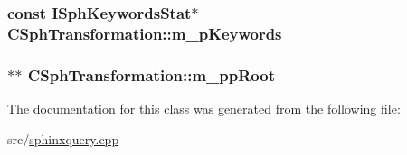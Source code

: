 \hypertarget{classCSphTransformation_a30ec948b31d378614b00f6846eb86810}{
\subsubsection[{m\-\_\-p\-Keywords}]{\setlength{\rightskip}{0pt plus 5cm}const {\bf I\-Sph\-Keywords\-Stat}$\ast$ C\-Sph\-Transformation\-::m\-\_\-p\-Keywords\hspace{0.3cm}{\ttfamily [private]}}}\label{classCSphTransformation_a30ec948b31d378614b00f6846eb86810}
\hypertarget{classCSphTransformation_a22e11aba813c6cd8fccd1268da6f099e}{
\subsubsection[{m\-\_\-pp\-Root}]{$\ast$$\ast$ C\-Sph\-Transformation\-::m\-\_\-pp\-Root\hspace{0.3cm}{\ttfamily [private]}}}\label{classCSphTransformation_a22e11aba813c6cd8fccd1268da6f099e}


The documentation for this class was generated from the following file\-:\begin{DoxyCompactItemize}
\item 
src/\hyperlink{sphinxquery_8cpp}{sphinxquery.\-cpp}\end{DoxyCompactItemize}
